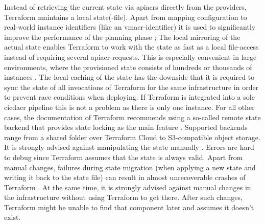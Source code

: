 \newline
Instead of retrieving the current state via \gls{apiacr}s directly from the providers, Terraform maintains a local state(-file). Apart from mapping configuration to real-world instance identifiers (like an \gls{vmacr}-identifier) it is used to significantly improve the performance of the planning phase \cite{terraform_state}; The local mirroring of the actual state enables Terraform to work with the state as fast as a local file-access instead of requiring several \gls{apiacr}-requests. This is especially convenient in large environments, where the provisioned state consists of hundreds or thousands of instances \cite{terraform_state_purpose}.
The local caching of the state has the downside that it is required to sync the state of all invocations of Terraform for the same infrastructure \cite{terraform_state_purpose} in order to prevent race conditions when deploying. If Terraform is integrated into a sole \gls{cicdacr} pipeline this is not a problem as there is only one instance. For all other cases, the documentation of Terraform recommends using a so-called remote state backend that provides state locking as the main feature \cite{terraform_remote_state}. Supported backends range from a shared folder over Terraform Cloud to S3-compatible object storage.
\newline
It is strongly advised against manipulating the state manually \cite{terraform_state}. Errors are hard to debug since Terraform assumes that the state is always valid. Apart from manual changes, failures during state migration (when applying a new state and writing it back to the state file) can result in almost unrecoverable crashes of Terraform \cite{terraform_no_rollback}.
\newline
At the same time, it is strongly advised against manual changes in the infrastructure without using Terraform to get there. After such changes, Terraform might be unable to find that component later and assumes it doesn't exist.

